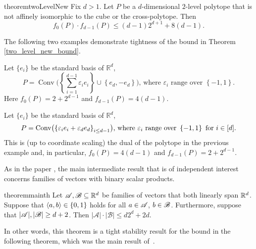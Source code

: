 \begin{restatable}{theorem}{twoLevelNew}
    \label{two_level_new_bound}
    Fix $d>1$. Let $P$ be a $d$-dimensional $2$-level polytope that is not affinely isomorphic to the cube or the cross-polytope. Then 
    \[
        f_0(P) \cdot f_{d-1}(P) \leq \left(d-1\right) 2^{d+1} + 8\left(d-1\right).
    \]
\end{restatable}
 \noindent The following two examples demonstrate tightness of the bound in Theorem \ref{two_level_new_bound}.
\begin{example}\label{CubeSuspension}
    Let $\{e_i\}$ be the standard basis of $\mathbb{R}^d$,
    \begin{equation*}
        P=\operatorname{Conv}\Biggl(\left\{\sum_{i=1}^{d-1}\varepsilon_i e_i\right\}\cup\left\{e_d, -e_d\right\}\Biggr)\text{, where }\varepsilon_i\text{ range over }\left\{-1, 1\right\}.
    \end{equation*}
 Here $f_0(P) = 2 + 2^{d-1}$ and $f_{d-1}(P) = 4(d-1)$.
\end{example}
\begin{example}\label{OctahedronCrossSegment}
    Let $\{e_i\}$ be the standard basis of $\mathbb{R}^d$,
    \begin{equation*}
        P=\operatorname{Conv}\bigl(\left\{{\varepsilon}_i e_i + {\varepsilon}_d e_d\right\}_{i\leq d-1}\bigr)\text{, where }{\varepsilon}_i\text{ range over }\left\{-1, 1\right\}\text{ for $i\in[d]$}.
    \end{equation*}
      This is (up to coordinate scaling) the dual of the polytope in the previous example and, in particular,  $f_0(P) = 4(d-1)$ and $f_{d-1}(P) = 2 + 2^{d-1}$. 
\end{example}


\noindent As in the paper \cite{kupavskii22}, the main intermediate result that is of independent interest concerns families of vectors with binary scalar products.

\begin{restatable}[]{theorem}{mainth}\label{d2d_plus_2d}
     Let ${\mathscr{A}},{\mathscr{B}} \subseteq {\mathbb{R}}^d$ be families of vectors that both linearly span ${\mathbb{R}}^d$. Suppose that $\langle a, b\rangle \in \{0,1\}$ holds for all $a \in {\mathscr{A}}$, $b \in {\mathscr{B}}$. Furthermore, suppose that $|{\mathscr{A}}|,|{\mathscr{B}}|\ge d+2$. Then $\left|\mathcal{A}\right| \cdot\left|\mathcal{B}\right| \leq d 2^d + 2d$.
\end{restatable}

\noindent In other words, this theorem is a tight stability result for the bound in the following theorem, which was the main result of~\cite{kupavskii22}.

